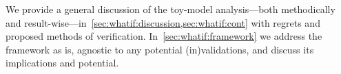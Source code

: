 





\newcommand\Ft{\ALIASFt}
\newcommand\ah{\ALIASah}
\newcommand\lcoord{\ALIASlcoord}
\newcommand\lcoordx{\ALIASlcoordx}
\newcommand\lcoordk{\ALIASlcoordk}
\newcommand\hpA{\ALIAShpA}
\newcommand\hpB{\ALIAShpB}
\newcommand\hpC{\ALIAShpC}
\newcommand\hpAB{\ALIAShpAB}
\newcommand\hpCR{\ALIAShpCR}
\newcommand\hpCI{\ALIAShpCI}
\newcommand\epsA{\ALIASepsA}
\newcommand\epsB{\ALIASepsB}
\newcommand\epsC{\ALIASepsC}
\newcommand\wallsep{\ALIASwallsep}










We provide a general discussion of the toy-model analysis---both methodically and result-wise---in~\cref{sec:whatif:discussion,sec:whatif:cont} with regrets and proposed methods of verification. In~\cref{sec:whatif:framework} we address the framework as is, agnostic to any potential (in)validations, and discuss its implications and potential.















